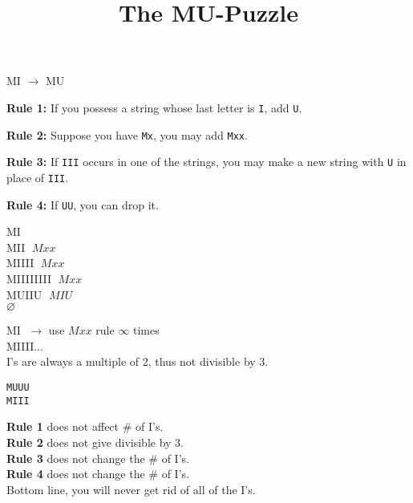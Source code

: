\documentclass{article}
\title{The MU-Puzzle}
\date{}
\begin{document}
\maketitle

MI $\rightarrow$ MU

\textbf{Rule 1:} If you possess a string whose last letter is \texttt{I}, add \texttt{U}.

\textbf{Rule 2:} Suppose you have \texttt{Mx}, you may add \texttt{Mxx}.

\textbf{Rule 3:} If \texttt{III} occurs in one of the strings, you may make a new string with \texttt{U} in place of \texttt{III}.

\textbf{Rule 4:} If \texttt{UU}, you can drop it.

\vspace{1em}

MI \\
MII $\; Mxx$ \\
MIIII $\; Mxx$ \\
MIIIIIIII $\; Mxx$ \\
MUIIU $\; MIU$ \\
$\varnothing$

\vspace{1em}

MI $\; \rightarrow$ use $Mxx$ rule $\infty$ times \\
MIIII... \\

I's are always a multiple of 2, thus not divisible by 3.

\vspace{1em}

\texttt{MUUU} \\
\texttt{MIII}

\vspace{1em}

\textbf{Rule 1} does not affect \# of I's. \\
\textbf{Rule 2} does not give divisible by 3. \\
\textbf{Rule 3} does not change the \# of I's. \\
\textbf{Rule 4} does not change the \# of I's. \\

Bottom line, you will never get rid of all of the I's.
\end{document}
